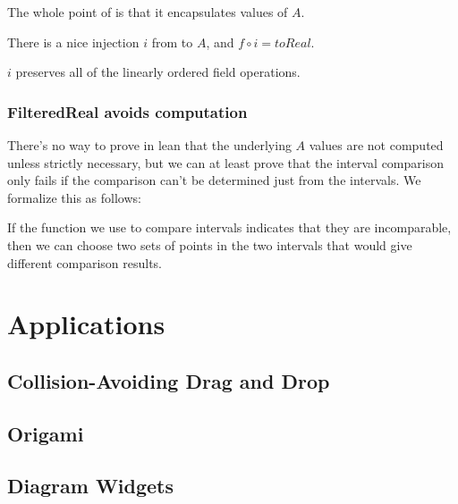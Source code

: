 The whole point of  is that it encapsulates values of
$A$.

\begin{definition}
  \label{def:filteredToA}
  \notready
  There is a nice injection $i$ from  to
  $A$, and $f \circ i = toReal$.
\end{definition}

\begin{theorem}
  \label{def:filteredEquivalent}
  \notready
  $i$ preserves all of the linearly ordered field operations.
\end{theorem}

\subsection{FilteredReal avoids computation}

There's no way to prove in lean that the underlying $A$ values are not computed
unless strictly necessary, but we can at least prove that the interval
comparison only fails if the comparison can't be determined just from the
intervals. We formalize this as follows:

\begin{lemma}
  \label{thm:compareComplete}
  \notready
  If the function we use to compare intervals indicates that they are
  incomparable, then we can choose two sets of points in the two intervals that
  would give different comparison results.
\end{lemma}

\chapter{Applications}

\section{Collision-Avoiding Drag and Drop}

\section{Origami}

\section{Diagram Widgets}

